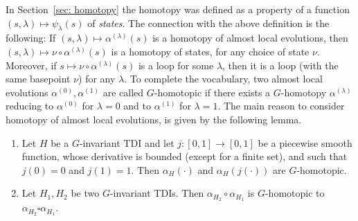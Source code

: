 In Section~\ref{sec: homotopy} the homotopy was defined as a property of a function $(s,\lambda)\mapsto \psi_\lambda(s)$ of \emph{states}. The connection with the above definition is the following: If $(s,\lambda)\mapsto \alpha^{(\lambda)}(s)$ is a homotopy of almost local evolutions, then $(s,\lambda)\mapsto \nu\circ\alpha^{(\lambda)}(s)$ is a homotopy of states, for any choice of state $\nu$. Moreover, if $s \mapsto \nu\circ\alpha^{(\lambda)}(s)$ is a loop for some $\lambda$, then it is a loop (with the same basepoint $\nu$) for any $\lambda$.
To complete the vocabulary, two almost local evolutions $\alpha^{(0)},\alpha^{(1)}$ are called $G$-homotopic if there exists a $G$-homotopy $\alpha^{(\lambda)}$ reducing to $\alpha^{(0)}$ for $\lambda=0$ and to $\alpha^{(1)}$ for $\lambda=1$. 
The main reason to consider homotopy of almost local evolutions, is given by the following lemma.
\begin{lemma}\label{lem: composition of loops is homotopic to concatenation}
	\begin{enumerate}
		\item Let $H$ be a $G$-invariant TDI and let $j: [0,1]\to [0,1]$ be a piecewise smooth function, whose derivative is bounded (except for a finite set), and such that $j(0)=0$ and $j(1)=1$. Then $\alpha_H(\cdot)$ and $\alpha_H(j(\cdot))$ are $G$-homotopic. 
		\item Let $H_1,H_2$ be two $G$-invariant TDIs.  Then $\alpha_{H_2} \circ \alpha_{H_1}$ is $G$-homotopic to~$\alpha_{H_2} \square \alpha_{H_1}$.
	\end{enumerate}
\end{lemma}
